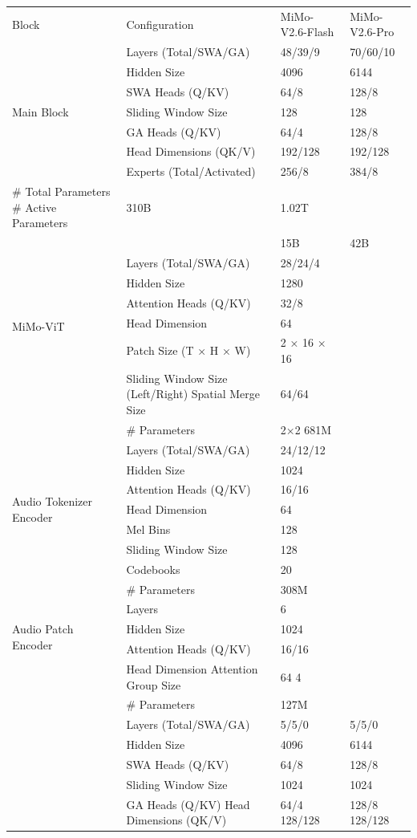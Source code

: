 \documentclass[
  10
]{article}
\newcounter{none} %
\begin{document}
{\def\LTcaptype{none} %
\begin{longtable}[]{@{}llll@{}}
\toprule\noalign{}
\endhead
\bottomrule\noalign{}
\endlastfoot
Block & Configuration & MiMo-V2.6-Flash & MiMo-V2.6-Pro \\
\multirow{7}{*}{Main Block} & Layers (Total/SWA/GA) & 48/39/9 &
70/60/10 \\
& Hidden Size & 4096 & 6144 \\
& SWA Heads (Q/KV) & 64/8 & 128/8 \\
& Sliding Window Size & 128 & 128 \\
& GA Heads (Q/KV) & 64/4 & 128/8 \\
& Head Dimensions (QK/V) & 192/128 & 192/128 \\
& Experts (Total/Activated) & 256/8 & 384/8 \\
\# Total Parameters \# Active Parameters & 310B & 1.02T & \\
\multirow{7}{*}{MiMo-ViT} & & 15B & 42B \\
& Layers (Total/SWA/GA) & 28/24/4 & \\
& Hidden Size & 1280 & \\
& Attention Heads (Q/KV) & 32/8 & \\
& Head Dimension & 64 & \\
& Patch Size (T × H × W) & 2 × 16 × 16 & \\
& Sliding Window Size (Left/Right) Spatial Merge Size & 64/64 & \\
& \# Parameters & 2×2 681M & \\
\multirow{7}{*}{Audio Tokenizer Encoder} & Layers (Total/SWA/GA) &
24/12/12 & \\
& Hidden Size & 1024 & \\
& Attention Heads (Q/KV) & 16/16 & \\
& Head Dimension & 64 & \\
& Mel Bins & 128 & \\
& Sliding Window Size & 128 & \\
& Codebooks & 20 & \\
\multirow{5}{*}{Audio Patch Encoder} & \# Parameters & 308M & \\
& Layers & 6 & \\
& Hidden Size & 1024 & \\
& Attention Heads (Q/KV) & 16/16 & \\
& Head Dimension Attention Group Size & 64 4 & \\
\multirow{5}{*}{} & \# Parameters & 127M & \\
& Layers (Total/SWA/GA) & 5/5/0 & 5/5/0 \\
& Hidden Size & 4096 & 6144 \\
& SWA Heads (Q/KV) & 64/8 & 128/8 \\
& Sliding Window Size & 1024 & 1024 \\
& GA Heads (Q/KV) Head Dimensions (QK/V) & 64/4 128/128 & 128/8
128/128 \\
\end{longtable}
}
\end{document}
